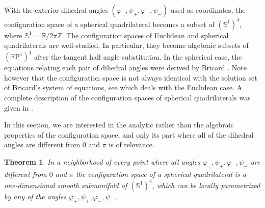 \documentclass{amsart}
\newtheorem{thm}{Theorem}
\theoremstyle{definition}
\renewcommand{\phi}{\varphi}
\newcommand\RR{\mathbb{R}}
\newcommand\ZZ{\mathbb{Z}}
\newcommand\Sph{\mathbb{S}}
\begin{document}
With the exterior dihedral angles $(\phi_+, \psi_+, \phi_-, \psi_-)$ used as coordinates, the configuration space of a spherical quadrilateral becomes a subset of $(\Sph^1)^4$, where $\Sph^1 = \RR/2\pi\ZZ$.
The configuration spaces of Euclidean and spherical quadrilaterals are well-studied.
In particular, they become algebraic subsets of $(\RR\mathrm{P}^1)^4$ after the tangent half-angle substitution.
In the spherical case, the equations relating each pair of dihedral angles were derived by Bricard \cite{Bricard1897}.
Note however that the configuration space is not always identical with the solution set of Bricard's system of equations, see \cite[Proposition 2.6]{Izmestiev2023} which deals with the Euclidean case.
A complete description of the configuration spaces of spherical quadrilaterals was given in \cite{Izmestiev2017}.

In this section, we are interested in the analytic rather than the algebraic properties of the configuration space, and only its part where all of the dihedral angles are different from $0$ and $\pi$ is of relevance.

\begin{thm}
\label{thm:NoFlatSubmanifold}
In a neighborhood of every point where all angles $\phi_+, \psi_+, \phi_-, \psi_-$ are different from $0$ and $\pi$ the configuration space of a spherical quadrilateral is a one-dimensional smooth submanifold of $(\Sph^1)^4$, which can be locally parametrized by any of the angles $\phi_+, \psi_+, \phi_-, \psi_-$.
\end{thm}
\end{document}
